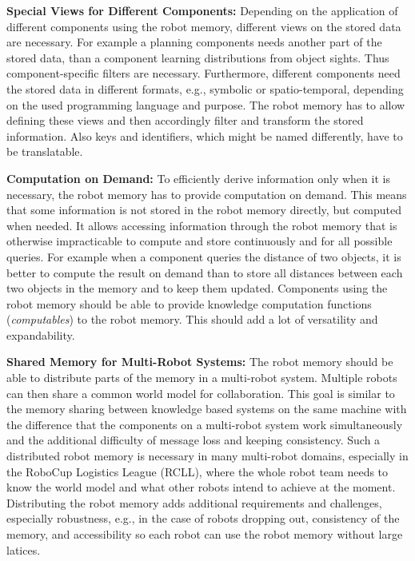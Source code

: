 \textbf{Special Views for Different Components:} Depending on the
application of different components using the robot memory, different
views on the stored data are necessary. For example a planning
components needs another part of the stored data, than a component
learning distributions from object sights. Thus component-specific
filters are necessary. Furthermore, different components need the
stored data in different formats, e.g., symbolic or spatio-temporal,
depending on the used programming language and purpose. The robot
memory has to allow defining these views and then accordingly filter
and transform the stored information. Also keys and identifiers, which
might be named differently, have to be translatable.

\textbf{Computation on Demand:}
  To efficiently derive
information only when it is necessary, the robot memory has to provide
computation on demand. This means that some information is not stored
in the robot memory directly, but computed when needed. It allows
accessing information through the robot memory that is otherwise
impracticable to compute and store continuously and for all possible
queries. For example when a component queries the distance of two
objects, it is better to compute the result on demand than to store
all distances between each two objects in the memory and to keep them
updated. Components using the robot memory should be able to provide
knowledge computation functions (\emph{computables}) to the robot
memory. This should add a lot of versatility and expandability.

\textbf{Shared Memory for Multi-Robot Systems:} The robot memory
should be able to distribute parts of the memory in a multi-robot
system. Multiple robots can then share a common world model for
collaboration. This goal is similar to the memory sharing between
knowledge based systems on the same machine with the difference that
the components on a multi-robot system work simultaneously and the
additional difficulty of message loss and keeping consistency. Such a
distributed robot memory is necessary in many multi-robot domains,
especially in the RoboCup Logistics League (RCLL), where the whole
robot team needs to know the world model and what other robots intend
to achieve at the moment.  Distributing the robot memory adds
additional requirements and challenges, especially robustness, e.g., in
the case of robots dropping out, consistency of the memory, and
accessibility so each robot can use the robot memory without large
latices.

